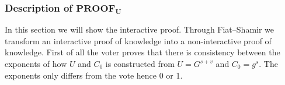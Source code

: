 \subsubsection{Description of $ \mathbf{PROOF_U} $}
In this section we will show the interactive proof. Through Fiat–Shamir  we transform an interactive proof of knowledge into a non-interactive proof of knowledge. First of all the voter proves that there is consistency between the exponents of how \begin{math}U\end{math} and \begin{math}C_0\end{math} is constructed from \begin{math}U=G^{s+v}\end{math} and \begin{math}C_0 = g^s\end{math}. The exponents only differs from the vote hence 0 or 1.\\

